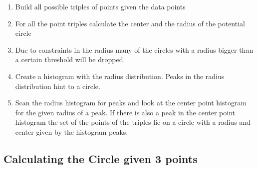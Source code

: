 \documentclass[10pt,twoside]{scrreprt}
\begin{document}
\begin{enumerate}
\item Build all possible triples of points given the data points
\item For all the point triples calculate the center and the radius of the potential circle
\item Due to constraints in the radius many of the circles with a radius bigger than a certain threshold will be dropped.
\item Create a histogram with the radius distribution. Peaks in the radius distribution hint to a circle.
\item Scan the radius histogram for peaks and look at the center point histogram for the given radius of a peak. If there is also a peak in the center point histogram
      the set of the points of the triples lie on a circle with a radius and center given by the histogram peaks.
\end{enumerate}

\subsection{Calculating the Circle given 3 points}
\end{document}

